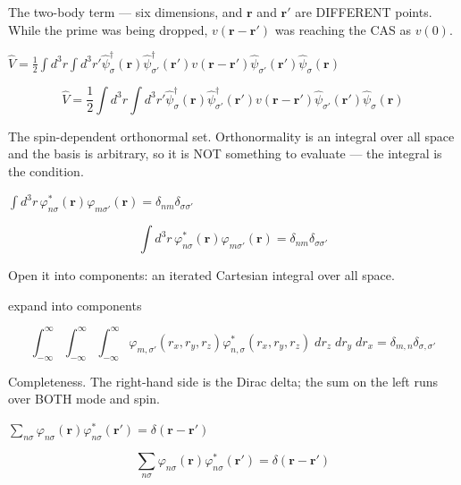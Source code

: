 \documentclass[dvipdfmx]{article}
\begin{document}
The two-body term — six dimensions, and $\mathbf r$ and $\mathbf r'$ are DIFFERENT points. While the prime was being dropped, $v(\mathbf r-\mathbf r')$ was reaching the CAS as $v(0)$.

$\hat V = \frac{1}{2}\int d^3r \int d^3r' \hat\psi^\dagger_\sigma(\mathbf{r}) \hat\psi^\dagger_{\sigma'}(\mathbf{r}') v(\mathbf{r}-\mathbf{r}') \hat\psi_{\sigma'}(\mathbf{r}') \hat\psi_\sigma(\mathbf{r})$

\begin{equation}
  \hat V = \frac{1}{2}\int d^3r \int d^3r' \hat\psi^\dagger_\sigma(\mathbf{r}) \hat\psi^\dagger_{\sigma'}(\mathbf{r}') v(\mathbf{r}-\mathbf{r}') \hat\psi_{\sigma'}(\mathbf{r}') \hat\psi_\sigma(\mathbf{r})
  \label{eq:E5}
\end{equation}

The spin-dependent orthonormal set. Orthonormality is an integral over all space and the basis is arbitrary, so it is NOT something to evaluate — the integral is the condition.

$\int d^3r\, \varphi^{\ast}_{n\sigma}(\mathbf{r}) \varphi_{m\sigma'}(\mathbf{r}) = \delta_{nm}\delta_{\sigma\sigma'}$

\begin{equation}
  \int d^3r\, \varphi^{\ast}_{n\sigma}(\mathbf{r}) \varphi_{m\sigma'}(\mathbf{r}) = \delta_{nm}\delta_{\sigma\sigma'}
  \label{eq:E6}
\end{equation}

Open it into components: an iterated Cartesian integral over all space.

expand into components

\begin{equation}
  \int_{-\infty }^{\infty }{\int_{-\infty }^{\infty }{\int_{-\infty }^{\infty }{\varphi_{m,\sigma'}(r_{x}, r_{y}, r_{z}) \varphi^{\ast}_{n,\sigma}(r_{x}, r_{y}, r_{z})\;dr_{z}}\;dr_{y}}\;dr_{x}}=\delta_{m, n}  \delta_{\sigma, \sigma'}
  \label{eq:E7}
\end{equation}

Completeness. The right-hand side is the Dirac delta; the sum on the left runs over BOTH mode and spin.

$\sum_{n\sigma} \varphi_{n\sigma}(\mathbf{r}) \varphi^{\ast}_{n\sigma}(\mathbf{r}') = \delta(\mathbf{r}-\mathbf{r}')$

\begin{equation}
  \sum_{n\sigma} \varphi_{n\sigma}(\mathbf{r}) \varphi^{\ast}_{n\sigma}(\mathbf{r}') = \delta(\mathbf{r}-\mathbf{r}')
  \label{eq:E8}
\end{equation}
\end{document}
